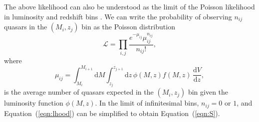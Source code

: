 \documentclass[fleqn,usenatbib]{mnras}
\begin{document}
The above likelihood can also be understood as the limit of the
Poisson likelihood in luminosity and redshift bins
\citep{1983ApJ...269...35M, 2001AJ....121...54F}.  We can write the
probability of observing $n_{ij}$ quasars in the $(M_i, z_j)$ bin as
the Poisson distribution
\begin{equation}
  \mathcal{L}=\prod_{i,j}\frac{e^{-\mu_{ij}}\mu_{ij}^{n_{ij}}}{n_{ij}!},
  \label{eqn:lhood}
\end{equation}
where 
\begin{equation}
  \mu_{ij}= \int_{M_i}^{M_{i+1}}\mathrm{d}M\int_{z_j}^{z_{j+1}}\mathrm{d}z\, \phi(M,z) f(M, z)
  \,\frac{\mathrm{d}V}{\mathrm{d}z},
\end{equation}
is the average number of quasars expected in the $(M_i, z_j)$ bin
given the luminosity function $\phi(M,z)$.  In the limit of
infinitesimal bins, $n_{ij}=0$ or $1$, and Equation~(\ref{eqn:lhood})
can be simplified to obtain Equation~(\ref{eqn:S}).
\end{document}
